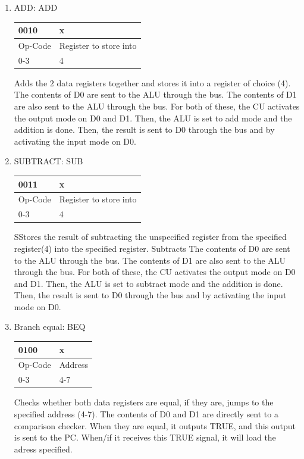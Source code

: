 \documentclass{article}
\begin{document}
\begin{enumerate}
\item ADD: ADD\\
  \begin{tabularx}{\textwidth}{|X|X|}
    \hline 0010 & x
    \\ \hline Op-Code & Register to store into
    \\ \hline 0-3 & 4
    \\ \hline
  \end{tabularx}
Adds the $2$ data registers together and stores it into a register of choice (4). The contents of D0 are sent to the ALU through the bus. The contents of D1 are also sent to the ALU through the bus. For both of these, the CU activates the output mode on D0 and D1. Then, the ALU is set to add mode and the addition is done. Then, the result is sent to D0 through the bus and by activating the input mode on D0.

\item SUBTRACT: SUB\\
  \begin{tabularx}{\textwidth}{|X|X|}
    \hline 0011 & x
    \\ \hline Op-Code & Register to store into
    \\ \hline 0-3 & 4
    \\ \hline
  \end{tabularx}
SStores the result of subtracting the unspecified register from the specified register(4) into the specified register. Subtracts The contents of D0 are sent to the ALU through the bus. The contents of D1 are also sent to the ALU through the bus. For both of these, the CU activates the output mode on D0 and D1. Then, the ALU is set to subtract mode and the addition is done. Then, the result is sent to D0 through the bus and by activating the input mode on D0.  

\item Branch equal: BEQ\\
  \begin{tabularx}{\textwidth}{|X|X|}
    \hline 0100 & x
    \\ \hline Op-Code & Address
    \\ \hline 0-3 & 4-7
    \\ \hline
  \end{tabularx}
Checks whether both data registers are equal, if they are, jumps to the specified address (4-7). The contents of D0 and D1 are directly sent to a comparison checker. When they are equal, it outputs TRUE, and this output is sent to the PC. When/if it receives this TRUE signal, it will load the adress specified.
  

\end{enumerate}
\end{document}
